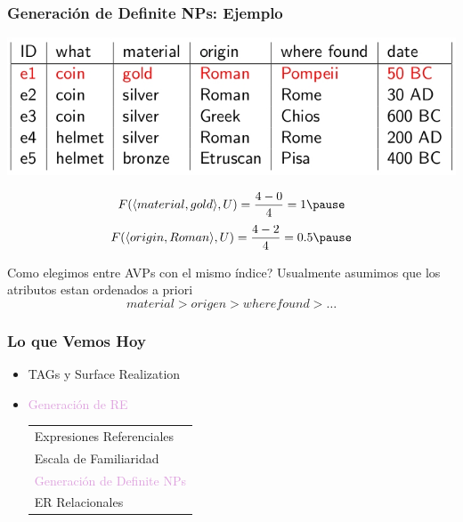 \documentclass[compress,color=usenames]{beamer}
\newcommand{\mH}[1]{\textcolor{Plum}{#1}}
\begin{document}
\begin{frame}
\frametitle{Generaci\'on de Definite NPs: Ejemplo}

\begin{center}
\includegraphics[scale=.5]{pics/pic3-24.jpg}
\end{center}

\vspace*{-.5cm}
$$
F(\langle material,gold \rangle,U) = \frac{4-0}{4} = 1 \pause
$$
\vspace*{-.1cm}
$$
F(\langle origin,Roman \rangle,U) = \frac{4-2}{4} = 0.5 \pause
$$

Como elegimos entre AVPs con el mismo \'indice? Usualmente asumimos 
que los atributos estan ordenados a priori
$$
material > origen > where found > \ldots
$$

\end{frame}

\begin{frame}
\frametitle{Lo que Vemos Hoy}

\begin{itemize}
\item TAGs y Surface Realization
\item \mH{Generaci\'on de RE}
\begin{tabular}{|l}
Expresiones Referenciales\\
Escala de Familiaridad\\
\mH{Generaci\'on de Definite NPs}\\
ER Relacionales 
\end{tabular}
\end{itemize}
\end{frame}
\end{document}
